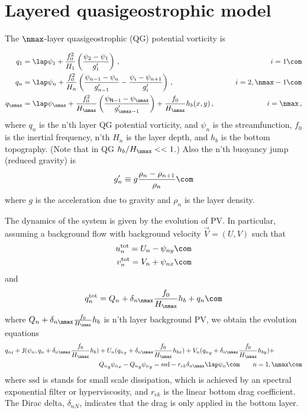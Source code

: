\documentclass[11pt]{article}
\newcommand{\ssd}{\text{ssd}}
\newcommand{\tot}{\text{tot}}
\begin{document}


\section*{Layered quasigeostrophic model}

The $\nmax$-layer quasigeostrophic (QG) potential vorticity is

\begin{align}
{q_1} &= \lap\psi_1 + \frac{f_0^2}{H_1} \left(\frac{\psi_{2}-\psi_1}{g'_{1}}\right)\,,  \qquad & i =1\com \nonumber \\
{q_n} &= \lap\psi_n + \frac{f_0^2}{H_n} \left(\frac{\psi_{n-1}-\psi_n}{g'_{n-1}}  - \frac{\psi_{i}-\psi_{n+1}}{g'_{i}}\right)\,,  \qquad &i = 2,\nmax-1 \com \nonumber \\
{q_\nmax} &= \lap\psi_\nmax + \frac{f_0^2}{H_\nmax} \left(\frac{\psi_{\textsf{N}-1}-\psi_\nmax}{g'_{\nmax-1}}\right) + \frac{f_0}{H_\nmax}h_b (x,y)\,,  \qquad & i =\nmax\,,
\end{align}
where $q_n$ is the n'th layer QG potential vorticity, and $\psi_n$ is the streamfunction, 
 $f_0$ is the inertial frequency, n'th $H_n$ is the layer depth, and $h_b$ is the 
bottom topography. (Note that in QG $h_b/H_\nmax << 1$.) Also the n'th buoyancy
jump (reduced gravity) is
\begin{equation}
g'_n \equiv g \frac{\rho_{n}-\rho_{n+1}}{\rho_n}\com
\end{equation}
where $g$ is the acceleration due to gravity and $\rho_n$ is the layer density.

The dynamics of the system is given by the evolution of PV. In particular, assuming a background
flow with background velocity $\vec{V} = (U,V)$ such that
\begin{align}
\label{eq:Uequiv}
u_n^{{\tot}} = U_n - \psi_{n y}\com \nonumber \\
v_n^{\tot} = V_n + \psi_{n x} \com
\end{align}
and
\begin{equation}
q_n^{\tot} = Q_n + \delta_{n\nmax}\frac{f_0}{H_\nmax}h_b + q_n \com
\end{equation}
where $Q_n + \delta_{n\nmax}\frac{f_0}{H_\nmax}h_b$ is n'th layer background PV,
we obtain the evolution equations
\begin{align}
\label{eq:qg_dynamics}
{q_n}_t + \mathsf{J}(\psi_n,q_n + \delta_{n \nmax} \frac{f_0}{H_\nmax}h_b )& + U_n ({q_n}_x + \delta_{n \nmax} \frac{f_0}{H_\nmax}h_{bx}) + V_n ({q_n}_y + \delta_{n \nmax} \frac{f_0}{H_\nmax}h_{by})+ \nonumber
\\ & {Q_n}_y {\psi_n}_x - {Q_n}_y {\psi_n}_y = \ssd
- r_{ek} \delta_{n\nmax} \lap \psi_n \com \qquad n = 1,\nmax\com
\end{align}
where $\ssd$ is 
stands for small scale dissipation, which is achieved by an spectral exponential filter
or hyperviscosity, and $r_{ek}$ is the linear bottom drag coefficient. The Dirac delta,
$\delta_{nN}$, indicates that the drag is only applied in the bottom layer.
\end{document}

